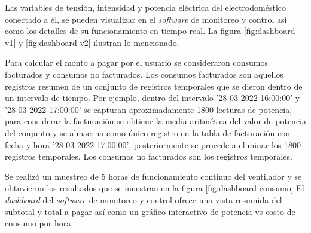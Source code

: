 Las variables de tensión, intensidad y potencia eléctrica del electrodoméstico conectado a él, se pueden visualizar en el \emph{software} de monitoreo y control así como los detalles de su funcionamiento en tiempo real. La figura \ref{fig:dashboard-v1} y \ref{fig:dashboard-v2} ilustran lo mencionado.

Para calcular el monto a pagar por el usuario se consideraron consumos facturados y consumos no facturados. Los consumos facturados son aquellos registros resumen de un conjunto de registros temporales que se dieron dentro de un intervalo de tiempo. Por ejemplo, dentro del intervalo '28-03-2022 16:00:00' y '28-03-2022 17:00:00' se capturan aproximadamente 1800 lecturas de potencia, para considerar la facturación se obtiene la media aritmética del valor de potencia del conjunto y se almacena como único registro en la tabla de facturación con fecha y hora '28-03-2022 17:00:00', posteriormente se procede a eliminar los 1800 registros temporales. Los consumos no facturados son los registros temporales. 

Se realizó un muestreo de 5 horas de funcionamiento continuo del ventilador y se obtuvieron los resultados que se muestran en la figura \ref{fig:dashboard-consumo} El \emph{dashboard} del \emph{software} de monitoreo y control ofrece una vista resumida del subtotal y total a pagar así como un gráfico interactivo de potencia vs costo de consumo por hora.

